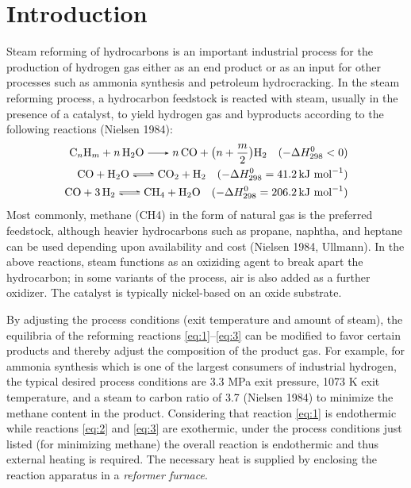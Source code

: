 \chapter{Introduction} \label{ch:introduction}

Steam reforming of hydrocarbons is an important industrial process for the production of hydrogen gas either as an end product or as an input for other processes such as ammonia synthesis and petroleum hydrocracking. In the steam reforming process, a hydrocarbon feedstock is reacted with steam, usually in the presence of a catalyst, to yield hydrogen gas and byproducts according to the following reactions (Nielsen 1984):
\begin{align}
\ce{C_{n}H_{m} + n H2O -> n CO + } \bigl(n + \frac{m}{2}\bigr) \ce{H2} \quad (-\Delta{}H^{0}_{298} < 0) \label{eq:1} \\
\ce{CO + H2O <=> CO2 + H2} \quad (-\Delta{}H^{0}_{298} = 41.2 \, \text{kJ mol}^{-1}) \label{eq:2} \\
\ce{CO + 3H2 <=> CH4 + H2O} \quad (-\Delta{}H^{0}_{298} = 206.2 \, \text{kJ mol}^{-1}) \label{eq:3}
\end{align}
Most commonly, methane (CH4) in the form of natural gas is the preferred feedstock, although heavier hydrocarbons such as propane, naphtha, and heptane can be used depending upon availability and cost (Nielsen 1984, Ullmann). In the above reactions, steam functions as an oxiziding agent to break apart the hydrocarbon; in some variants of the process, air is also added as a further oxidizer. The catalyst is typically nickel-based on an oxide substrate.

By adjusting the process conditions (exit temperature and amount of steam), the equilibria of the reforming reactions \ref{eq:1}--\ref{eq:3} can be modified to favor certain products and thereby adjust the composition of the product gas. For example, for ammonia synthesis which is one of the largest consumers of industrial hydrogen, the typical desired process conditions are 3.3 MPa exit pressure, 1073 K exit temperature, and a steam to carbon ratio of 3.7 (Nielsen 1984) to minimize the methane content in the product. Considering that reaction \ref{eq:1} is endothermic while reactions \ref{eq:2} and \ref{eq:3} are exothermic, under the process conditions just listed (for minimizing methane) the overall reaction is endothermic and thus external heating is required. The necessary heat is supplied by enclosing the reaction apparatus in a \emph{reformer furnace}.

